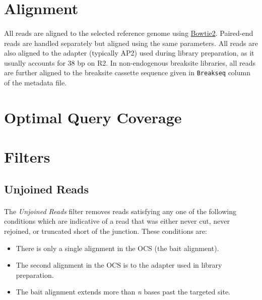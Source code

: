 \documentclass{article}
\begin{document}
\section{Alignment}

\paragraph{} All reads are aligned to the selected reference genome using \href{}{Bowtie2}. Paired-end reads are handled separately but aligned using the same parameters. All reads are also aligned to the adapter (typically AP2) used during library preparation, as it usually accounts for 38 bp on R2. In non-endogenous breaksite libraries, all reads are further aligned to the breaksite cassette sequence given in \texttt{Breakseq} column of the metadata file.

\section{Optimal Query Coverage}

\paragraph{} 


\section{Filters}
\subsection*{Unjoined Reads}
\paragraph{} The \emph{Unjoined Reads} filter removes reads satisfying any one of the following conditions which are indicative of a read that was either never cut, never rejoined, or truncated short of the junction. These conditions are:
\begin{itemize}
  \item There is only a single alignment in the OCS (the bait alignment).
  \item The second alignment in the OCS is to the adapter used in library preparation.
  \item The bait alignment extends more than \emph{n} bases past the targeted site.
\end{itemize}
\end{document}
